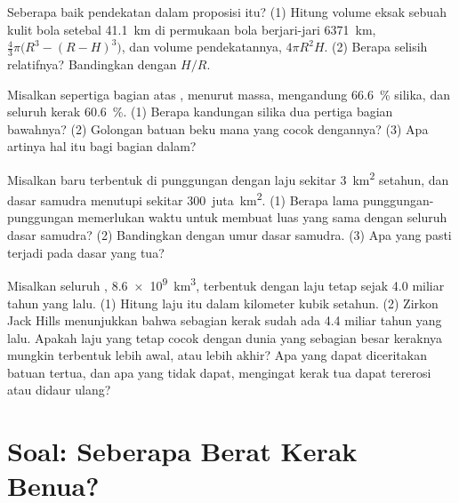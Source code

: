 \begin{exercise}[$\star\star\star$]\label{exo:g12:continental-crust:12}
Seberapa baik pendekatan dalam proposisi itu? (1) Hitung volume eksak sebuah
kulit bola setebal \qty{41.1}{km} di permukaan bola berjari-jari
\qty{6371}{km}, $\tfrac{4}{3}\pi\bigl(R^3 - (R - H)^3\bigr)$, dan volume
pendekatannya, $4\pi R^2 H$. (2) Berapa selisih relatifnya? Bandingkan dengan
$H/R$.
\end{exercise}

\begin{exercise}[$\star\star\star$]\label{exo:g12:continental-crust:13}
Misalkan sepertiga bagian atas , menurut massa, mengandung
\qty{66.6}{\percent} silika, dan seluruh kerak \qty{60.6}{\percent}. (1)
Berapa kandungan silika dua pertiga bagian bawahnya? (2) Golongan batuan beku
mana yang cocok dengannya? (3) Apa artinya hal itu bagi  bagian
dalam?
\end{exercise}

\begin{exercise}[$\star\star\star$]\label{exo:g12:continental-crust:14}
Misalkan  baru terbentuk di punggungan dengan laju sekitar
\qty{3}{km^2} setahun, dan dasar samudra menutupi sekitar \num{300}~juta~\unit{km^2}. (1)
Berapa lama punggungan-punggungan memerlukan waktu untuk membuat luas yang sama
dengan seluruh dasar samudra? (2) Bandingkan dengan umur dasar samudra. (3) Apa
yang pasti terjadi pada dasar yang tua?
\end{exercise}

\begin{exercise}[$\star\star\star$]\label{exo:g12:continental-crust:15}
Misalkan seluruh , \qty{8.6e9}{km^3}, terbentuk dengan laju tetap
sejak 4.0 miliar tahun yang lalu. (1) Hitung laju itu dalam kilometer kubik
setahun. (2) Zirkon Jack Hills menunjukkan bahwa sebagian kerak sudah ada 4.4
miliar tahun yang lalu. Apakah laju yang tetap cocok dengan dunia yang sebagian
besar keraknya mungkin terbentuk lebih awal, atau lebih akhir? Apa yang dapat
diceritakan batuan tertua, dan apa yang tidak dapat, mengingat kerak tua dapat
tererosi atau didaur ulang?
\end{exercise}
\section{Soal: Seberapa Berat Kerak Benua?}

